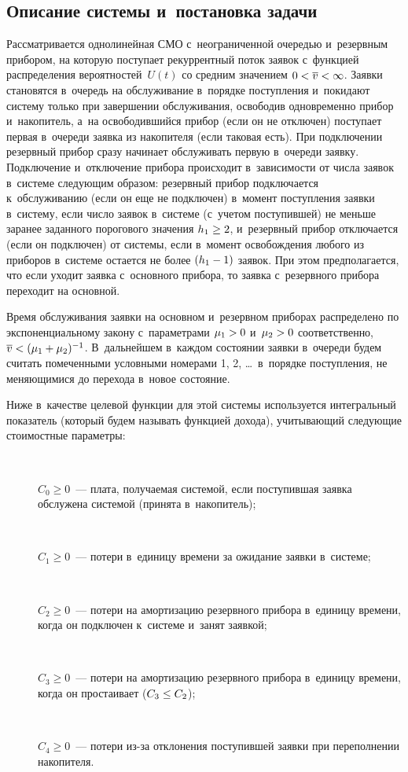 \begin{multicols}{2}
\vspace*{-12pt}

\section{Описание системы и~постановка задачи}

\vspace*{-4pt}

  Рассматривается однолинейная СМО с~неограниченной очередью 
и~резервным прибором, на которую поступает рекуррентный поток заявок 
с~функцией распределения вероятностей~$U(t)$ со средним значением $0\hm< 
\overline{v}\hm<\infty$. Заявки становятся в~очередь на обслуживание в~порядке 
поступления и~покидают сис\-те\-му только при завершении обслуживания, 
освободив одновременно прибор и~накопитель, а~на освободившийся прибор 
(если он не отключен) поступает первая в~очереди заявка из накопителя (если 
таковая есть). При подключении резервный прибор сразу начинает обслуживать 
первую в~очереди заявку. Подключение и~отключение прибора происходит 
в~зависимости от чис\-ла заявок в~сис\-те\-ме сле\-ду\-ющим образом: 
резервный прибор подключается к~обслуживанию (если он еще не подключен) в~момент поступления заявки в~сис\-те\-му, если чис\-ло заявок в~сис\-те\-ме 
(с~учетом поступившей) не меньше заранее заданного порогового значения 
$h_1\hm \geq 2$, и~резервный прибор отключается (если он подключен) от  
сис\-те\-мы, если в~момент освобождения любого из приборов в~сис\-те\-ме 
остается не более $(h_1\hm-1)$ заявок. При этом предполагается, что если 
уходит заявка с~основного прибора, то заявка с~резервного прибора переходит 
на основной. 

Время обслуживания заявки на основном и~резервном приборах 
распределено по экспоненциальному закону с~па\-ра\-мет\-ра\-ми  
$\mu_1\hm> 0$ и~$\mu_2\hm>0$ соответственно, $\overline{v}\hm< 
(\mu_1\hm+\mu_2)^{-1}$. В~дальнейшем в~каждом состоянии заявки в~очереди 
будем считать помеченными условными номерами 1, 2, \ldots\ в~порядке 
поступления, не меняющимися до перехода в~новое со\-сто\-яние. 
  
  Ниже в~качестве целевой функции для этой сис\-те\-мы используется 
интегральный показатель (который будем называть функцией дохода), 
учи\-ты\-ва\-ющий сле\-ду\-ющие стоимостные па\-ра\-метры: 
  \begin{description}
  \item[\,] $C_0\geq0$~--- плата, получаемая сис\-те\-мой, если поступившая 
заявка обслужена сис\-те\-мой (принята в~накопитель); 
  \item[\,] $C_1\geq 0$~--- потери в~единицу времени за ожидание заявки 
в~сис\-те\-ме;
  \item[\,] $C_2\geq 0$~--- потери на амортизацию резервного прибора 
в~единицу времени, когда он подключен к~сис\-те\-ме и~занят заявкой;
  \item[\,] $C_3\geq 0$~--- потери на амортизацию резервного прибора 
в~единицу времени, когда он простаивает ($C_3\hm\leq C_2$);
  \item[\,] $C_4\geq 0$~--- потери из-за отклонения поступившей заявки при 
переполнении накопителя. 
  \end{description}
  

\end{multicols}
